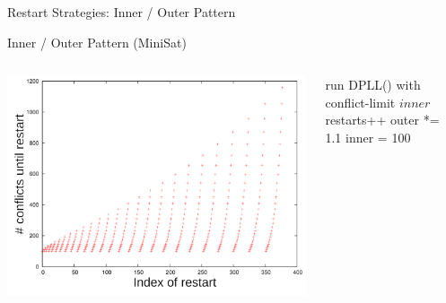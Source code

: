 \documentclass[t]{sdqbeamer}
\begin{document}
\begin{frame}{Restart Strategies: Inner / Outer Pattern}
\begin{block}{Inner / Outer Pattern (MiniSat)}
\begin{columns}[T]
\begin{column}{0.5\textwidth}
	\centering
	\includegraphics[width=\textwidth]{figures/l04/restart-inout-legend}
\end{column}
\begin{column}{0.45\textwidth}
\begin{algorithm}[H]
	\DontPrintSemicolon
	\caption{Inner / Outer}
	\BlankLine
	 {
		run DPLL() with conflict-limit $inner$\;
		restarts++\;
		 {
			outer *= 1.1\;
			inner = 100\;
		}
	}
\end{algorithm}
\end{column}
\end{columns}
\end{block}
\end{frame}
\end{document}
